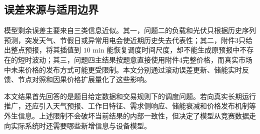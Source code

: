 \subsection{误差来源与适用边界}

模型剩余误差主要来自三类信息近似。其一，问题二的负载和光伏只根据历史序列预测，突发天气、节假日或异常用电会使近期历史失去代表性；其二，附件3只给出整点预报，将其插值到 $10$ min 能恢复调度时间尺度，却不能生成原预报中不存在的短时波动；其三，问题四主结果按题意直接使用附件4完整价格，而真实市场中未来价格的发布方式可能更受限制。本文分别通过滚动误差更新、储能实时反馈、节点对照和因果价格扩展量化了这些影响。

本文结果首先回答的是题目给定数据和交易规则下的调度问题。若向真实长期运行推广，还应引入天气预报、工作日特征、需求侧响应、储能衰减和价格发布机制等外生信息。上述限制不会破坏当前结果的内部一致性，但决定了模型从竞赛数据走向实际系统时还需要哪些新增信息与设备模型。

